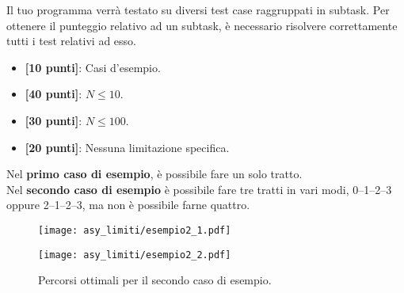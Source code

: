 \Scoring
Il tuo programma verrà testato su diversi test case raggruppati in subtask.
Per ottenere il punteggio relativo ad un subtask, è necessario risolvere
correttamente tutti i test relativi ad esso.

\begin{itemize}[nolistsep,itemsep=2mm]
  \item \textbf{ [10 punti]}: Casi d'esempio.
  \item \textbf{ [40 punti]}: $N \leq 10$.
  \item \textbf{ [30 punti]}: $N \leq 100$.
  \item \textbf{ [20 punti]}: Nessuna limitazione specifica.
\end{itemize}

\Examples
\begin{example}
%
\end{example}
\begin{example}
%
\end{example}


\Explanation
Nel \textbf{primo caso di esempio}, è possibile fare un solo tratto.\\[2mm]
Nel \textbf{secondo caso di esempio} è possibile fare tre tratti in vari modi, 0--1--2--3 oppure 2--1--2--3, ma non è possibile farne quattro.

\begin{figure}
	\begin{center}
		\begin{minipage}[t]{0.3\textwidth}
			\texttt{[image: asy\_limiti/esempio2\_1.pdf]}
		\end{minipage}
		\quad\quad\quad
		\begin{minipage}[t]{0.3\textwidth}
			\texttt{[image: asy\_limiti/esempio2\_2.pdf]}
		\end{minipage}
	\end{center}
	\caption{Percorsi ottimali per il secondo caso di esempio.}
\end{figure}
